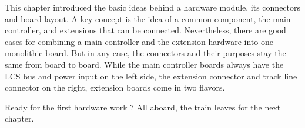 
This chapter introduced the basic ideas behind a hardware module, its connectors and board layout. A key concept is the idea of a common component, the main controller, and extensions that can be connected. Nevertheless, there are good cases for combining a main controller and the extension hardware into one monolithic board. But in any case, the connectors and their purposes stay the same from board to board. While the main controller boards always have the LCS bus and power input on the left side, the extension connector and track line connector on the right, extension boards come in two flavors. 

Ready for the first hardware work ? All aboard, the train leaves for the next chapter.

